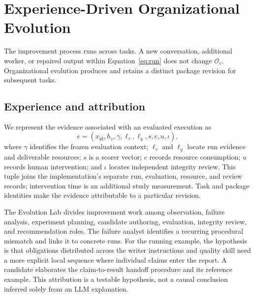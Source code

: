 \section{Experience-Driven Organizational Evolution}\label{sec:evolution}
The improvement process runs across tasks. A new conversation, additional worker, or repaired output within Equation~\ref{eq:run} does not change $\mathcal O_v$. Organizational evolution produces and retains a distinct package revision for subsequent tasks.

\subsection{Experience and attribution}
We represent the evidence associated with an evaluated execution as
\begin{equation}
e=(x_{\mathrm{id}},h_v,\gamma,\ell_{\tau},\ell_y,s,c,u,\iota),
\label{eq:experience}
\end{equation}
where $\gamma$ identifies the frozen evaluation context; $\ell_{\tau}$ and $\ell_y$ locate run evidence and deliverable resources; $s$ is a scorer vector; $c$ records resource consumption; $u$ records human intervention; and $\iota$ locates independent integrity review. This tuple joins the implementation's separate run, evaluation, resource, and review records; intervention time is an additional study measurement. Task and package identities make the evidence attributable to a particular revision.

The Evolution Lab divides improvement work among observation, failure analysis, experiment planning, candidate authoring, evaluation, integrity review, and recommendation roles. The failure analyst identifies a recurring procedural mismatch and links it to concrete runs. For the running example, the hypothesis is that obligations distributed across the writer instructions and quality skill need a more explicit local sequence where individual claims enter the report. A candidate elaborates the claim-to-result handoff procedure and its reference example. This attribution is a testable hypothesis, not a causal conclusion inferred solely from an LLM explanation.

